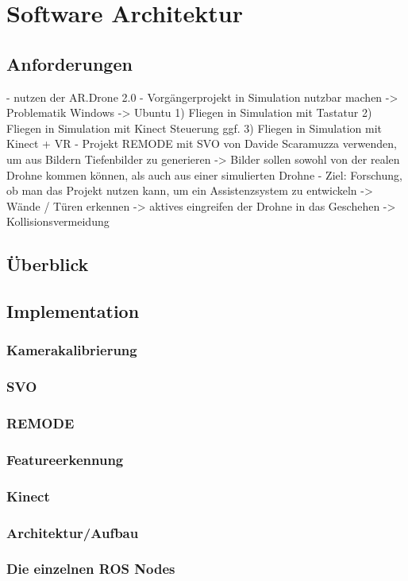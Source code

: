 
\chapter{Software Architektur}
\section{Anforderungen}
\label{sec:Anforderungen} 
- nutzen der AR.Drone 2.0
- Vorgängerprojekt in Simulation nutzbar machen
 -> Problematik Windows -> Ubuntu
 1) Fliegen in Simulation mit Tastatur 
 2) Fliegen in Simulation mit Kinect Steuerung
 ggf. 3) Fliegen in Simulation mit Kinect + VR
- Projekt REMODE mit SVO von Davide Scaramuzza verwenden, um aus Bildern Tiefenbilder zu generieren
-> Bilder sollen sowohl von der realen Drohne kommen können, als auch aus einer simulierten Drohne
- Ziel: Forschung, ob man das Projekt nutzen kann, um ein Assistenzsystem zu entwickeln
	-> Wände / Türen erkennen
	-> aktives eingreifen der Drohne in das Geschehen -> Kollisionsvermeidung
	


\section{Überblick}
\label{Überblick}

\section{Implementation}
\label{Implementation}

\newpage
\subsection{Kamerakalibrierung}
\subsection{SVO}
\subsection{REMODE}
\subsection{Featureerkennung}
\subsection{Kinect}
\subsection{Architektur/Aufbau}
\subsection{Die einzelnen ROS Nodes}




